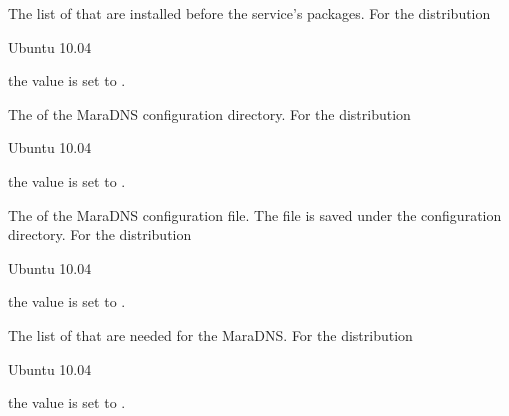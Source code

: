 
The list of  that are installed before the service's packages.
For the distribution
\begin{inparaitem}
\item[\TheDistribution{ubuntu}] Ubuntu 10.04
\end{inparaitem}
the value is set to .


The  of the MaraDNS configuration directory.
For the distribution
\begin{inparaitem}
\item[\TheDistribution{ubuntu}] Ubuntu 10.04
\end{inparaitem}
the value is set to .


The  of the MaraDNS configuration file. The file is saved
under the configuration directory.
For the distribution
\begin{inparaitem}
\item[\TheDistribution{ubuntu}] Ubuntu 10.04
\end{inparaitem}
the value is set to .


The list of  that are needed for the MaraDNS.
For the distribution
\begin{inparaitem}
\item[\TheDistribution{ubuntu}] Ubuntu 10.04
\end{inparaitem}
the value is set to .

